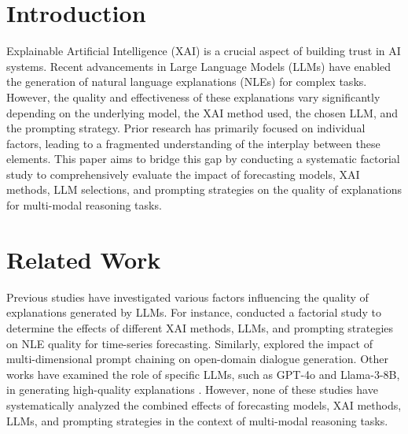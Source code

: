 \begin{abstract}
This paper presents a comprehensive factorial study on the generation of explanations for multi-modal reasoning tasks by Large Language Models (LLMs). We investigate the impact of forecasting models, Explainable AI (XAI) methods, LLM selections, and prompting strategies on the quality of natural language explanations. Using a standardized evaluation framework, such as G-Eval, we aim to provide a holistic understanding of the factors influencing explanation quality in complex, multi-modal scenarios. Our findings will contribute to the development of more robust and interpretable AI systems.
\end{abstract}

\section{Introduction}
\label{sec:introduction}
Explainable Artificial Intelligence (XAI) is a crucial aspect of building trust in AI systems. Recent advancements in Large Language Models (LLMs) have enabled the generation of natural language explanations (NLEs) for complex tasks. However, the quality and effectiveness of these explanations vary significantly depending on the underlying model, the XAI method used, the chosen LLM, and the prompting strategy. Prior research has primarily focused on individual factors, leading to a fragmented understanding of the interplay between these elements. This paper aims to bridge this gap by conducting a systematic factorial study to comprehensively evaluate the impact of forecasting models, XAI methods, LLM selections, and prompting strategies on the quality of explanations for multi-modal reasoning tasks.

\section{Related Work}
\label{sec:related_work}
Previous studies have investigated various factors influencing the quality of explanations generated by LLMs. For instance, \cite{lukassen2026xaistoriesfactorialstudy} conducted a factorial study to determine the effects of different XAI methods, LLMs, and prompting strategies on NLE quality for time-series forecasting. Similarly, \cite{teng2026multidimensionalpromptchainingimprove} explored the impact of multi-dimensional prompt chaining on open-domain dialogue generation. Other works have examined the role of specific LLMs, such as GPT-4o and Llama-3-8B, in generating high-quality explanations \cite{tomar2026doesprefixmatterreasoning}. However, none of these studies have systematically analyzed the combined effects of forecasting models, XAI methods, LLMs, and prompting strategies in the context of multi-modal reasoning tasks.

